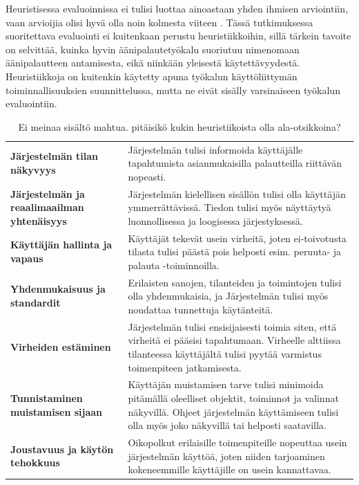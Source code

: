 \documentclass[utf8]{gradu3}
\begin{document}
Heuristisessa evaluoinnissa ei tulisi luottaa ainoastaan yhden ihmisen arviointiin, vaan arvioijia olisi hyvä olla noin kolmesta viiteen \parencite[][]{heuristic-evaluation}. Tässä tutkimuksessa suoritettava evaluointi ei kuitenkaan perustu heuristiikkoihin, sillä tärkein tavoite on selvittää, kuinka hyvin äänipalautetyökalu suoriutuu nimenomaan äänipalautteen antamisesta, eikä niinkään yleisestä käytettävyydestä. Heuristiikkoja on kuitenkin käytetty apuna työkalun käyttöliittymän toiminnallisuuksien suunnittelussa, mutta ne eivät sisälly varsinaiseen työkalun evaluointiin.


\begin{table}[htbp]
  \centering
  \caption{Ei meinaa sisältö mahtua. pitäisikö kukin heuristiikoista olla ala-otsikkoina?}
    \begin{tabular}{p{12.355em}p{21.855em}}
    \multicolumn{1}{l}{\textbf{Järjestelmän tilan näkyvyys}} & Järjestelmän tulisi informoida käyttäjälle tapahtumista asianmukaisilla palautteilla riittävän nopeasti. \\
    \textbf{Järjestelmän ja reaalimaailman yhtenäisyys} & Järjestelmän kielellisen sisällön tulisi olla käyttäjän ymmerrättävissä. Tiedon tulisi myös näyttäytyä luonnollisessa ja loogisessa järjestyksessä. \\
    \multicolumn{1}{l}{\textbf{Käyttäjän hallinta ja vapaus}} & Käyttäjät tekevät usein virheitä, joten ei-toivotusta tilasta tulisi päästä pois helposti esim. peruuta- ja palauta -toiminnoilla. \\
    \multicolumn{1}{l}{\textbf{Yhdenmukaisuus ja standardit}} & Erilaisten sanojen, tilanteiden ja toimintojen tulisi olla yhdenmukaisia, ja Järjestelmän tulisi myös noudattaa tunnettuja käytänteitä. \\
    \multicolumn{1}{l}{\textbf{Virheiden estäminen}} & Järjestelmän tulisi ensisijaisesti toimia siten, että virheitä ei pääsisi tapahtumaan. Virheelle alttiissa tilanteessa käyttäjältä tulisi pyytää varmistus toimenpiteen jatkamisesta. \\
    \textbf{Tunnistaminen muistamisen sijaan} & Käyttäjän muistamisen tarve tulisi minimoida pitämällä oleelliset objektit, toiminnot ja valinnat näkyvillä. Ohjeet järjestelmän käyttämiseen tulisi olla myös joko näkyvillä tai helposti saatavilla. \\
    \multicolumn{1}{l}{\textbf{Joustavuus ja käytön tehokkuus}} & Oikopolkut erilaisille toimenpiteille nopeuttaa usein järjestelmän käyttöä, joten niiden tarjoaminen kokeneemmille käyttäjille on usein kannattavaa.  \\

\end{tabular}
\end{table}
\end{document}
